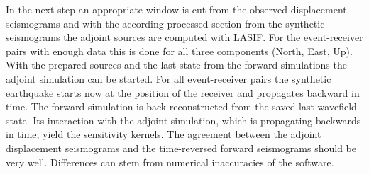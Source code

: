 In the next step an appropriate window %
is cut from the observed displacement seismograms and with the according processed section from the synthetic seismograms 
the adjoint sources are computed with LASIF.
For the event-receiver pairs with enough data this is done for all three components (North, East, Up).
With the prepared sources and the last state from the forward simulations the adjoint simulation can be started.
For all event-receiver pairs the synthetic earthquake starts now at the position of the receiver and propagates
backward in time.  
The forward simulation is back reconstructed from the saved last wavefield state. 
Its interaction with the adjoint simulation, which is propagating backwards in time,
yield the sensitivity kernels. %
The agreement between the adjoint displacement seismograms and the time-reversed forward seismograms should be very well.
Differences can stem from numerical inaccuracies of the software. %









